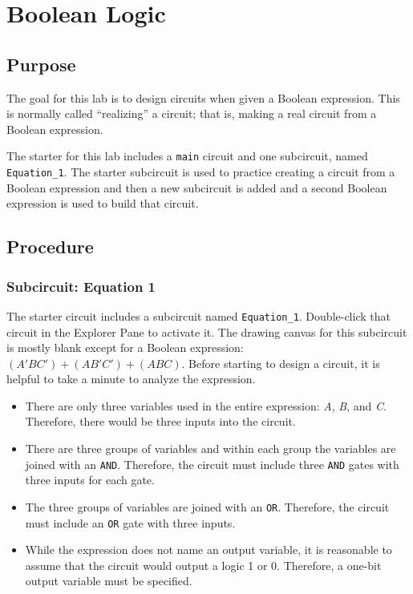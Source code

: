 \chapter{Boolean Logic}\label{bool}

\section{Purpose}

The goal for this lab is to design circuits when given a Boolean expression. This is normally called ``realizing'' a circuit; that is, making a real circuit from a Boolean expression.

The \LE starter for this lab includes a \lstinline[columns=fixed]|main| circuit and one subcircuit, named \lstinline[columns=fixed]|Equation_1|. The starter subcircuit is used to practice creating a circuit from a Boolean expression and then a new subcircuit is added and a second Boolean expression is used to build that circuit.

\section{Procedure}

\subsection{Subcircuit: Equation 1}

The starter circuit includes a subcircuit named \lstinline[columns=fixed]|Equation_1|. Double-click that circuit in the Explorer Pane to activate it. The drawing canvas for this subcircuit is mostly blank except for a Boolean expression: $ (A'BC')+(AB'C')+(ABC) $. Before starting to design a circuit, it is helpful to take a minute to analyze the expression. 

\begin{itemize}
	\item There are only three variables used in the entire expression: \textit{A}, \textit{B}, and \textit{C}. Therefore, there would be three inputs into the circuit.
	\item There are three groups of variables and within each group the variables are joined with an \texttt{AND}. Therefore, the circuit must include three \texttt{AND} gates with three inputs for each gate.
	\item The three groups of variables are joined with an \texttt{OR}. Therefore, the circuit must include an \texttt{OR} gate with three inputs.
	\item While the expression does not name an output variable, it is reasonable to assume that the circuit would output a logic 1 or 0. Therefore, a one-bit output variable must be specified.
\end{itemize}

